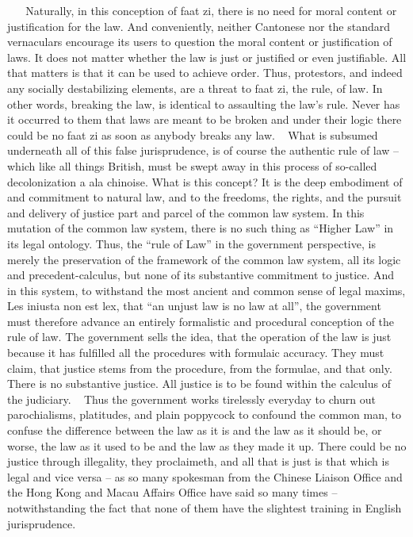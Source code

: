  
 
Naturally, in this conception of faat zi, there is no need for moral content or justification for the law. And conveniently, neither Cantonese nor the standard vernaculars encourage its users to question the moral content or justification of laws. It does not matter whether the law is just or justified or even justifiable. All that matters is that it can be used to achieve order. Thus, protestors, and indeed any socially destabilizing elements, are a threat to faat zi, the rule, of law. In other words, breaking the law, is identical to assaulting the law’s rule. Never has it occurred to them that laws are meant to be broken and under their logic there could be no faat zi as soon as anybody breaks any law.
 
What is subsumed underneath all of this false jurisprudence, is of course the authentic rule of law – which like all things British, must be swept away in this process of so-called decolonization a ala chinoise. What is this concept? It is the deep embodiment of and commitment to natural law, and to the freedoms, the rights, and the pursuit and delivery of justice part and parcel of the common law system. In this mutation of the common law system, there is no such thing as “Higher Law” in its legal ontology. Thus, the “rule of Law” in the government perspective, is merely the preservation of the framework of the common law system, all its logic and precedent-calculus, but none of its substantive commitment to justice. And in this system, to withstand the most ancient and common sense of legal maxims, Les iniusta non est lex, that “an unjust law is no law at all”, the government must therefore advance an entirely formalistic and procedural conception of the rule of law. The government sells the idea, that the operation of the law is just because it has fulfilled all the procedures with formulaic accuracy. They must claim, that justice stems from the procedure, from the formulae, and that only. There is no substantive justice. All justice is to be found within the calculus of the judiciary.
 
Thus the government works tirelessly everyday to churn out parochialisms, platitudes, and plain poppycock to confound the common man, to confuse the difference between the law as it is and the law as it should be, or worse, the law as it used to be and the law as they made it up. There could be no justice through illegality, they proclaimeth, and all that is just is that which is legal and vice versa – as so many spokesman from the Chinese Liaison Office and the Hong Kong and Macau Affairs Office have said so many times – notwithstanding the fact that none of them have the slightest training in English jurisprudence.

